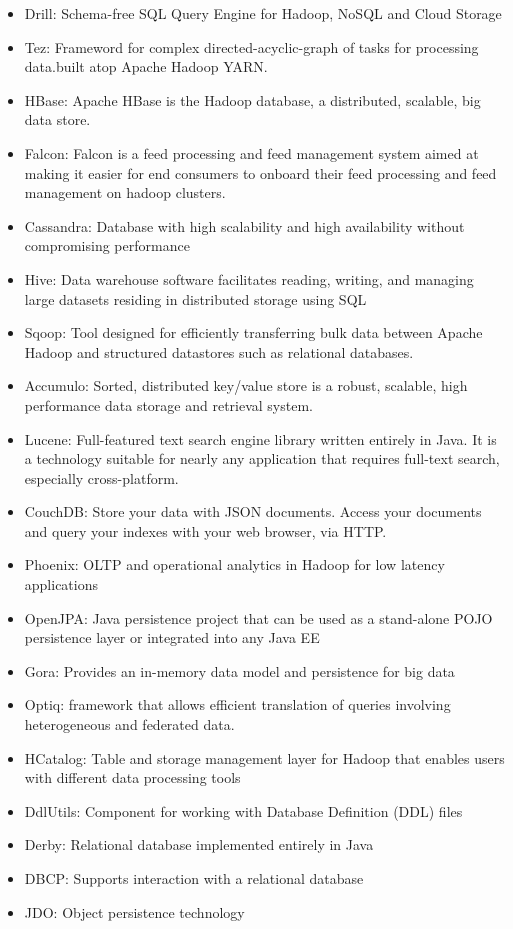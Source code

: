 \documentclass[12pt]{report}
\providecommand{\tightlist}{%
  \setlength{\itemsep}{0pt}\setlength{\parskip}{0pt}}
\begin{document}
\begin{itemize}
\tightlist
\item
  Drill: Schema-free SQL Query Engine for Hadoop, NoSQL and Cloud
  Storage
\item
  Tez: Frameword for complex directed-acyclic-graph of tasks for
  processing data.built atop Apache Hadoop YARN.
\item
  HBase: Apache HBase is the Hadoop database, a distributed, scalable,
  big data store.
\item
  Falcon: Falcon is a feed processing and feed management system aimed
  at making it easier for end consumers to onboard their feed processing
  and feed management on hadoop clusters.
\item
  Cassandra: Database with high scalability and high availability
  without compromising performance
\item
  Hive: Data warehouse software facilitates reading, writing, and
  managing large datasets residing in distributed storage using SQL
\item
  Sqoop: Tool designed for efficiently transferring bulk data between
  Apache Hadoop and structured datastores such as relational databases.
\item
  Accumulo: Sorted, distributed key/value store is a robust, scalable,
  high performance data storage and retrieval system.
\item
  Lucene: Full-featured text search engine library written entirely in
  Java. It is a technology suitable for nearly any application that
  requires full-text search, especially cross-platform.
\item
  CouchDB: Store your data with JSON documents. Access your documents
  and query your indexes with your web browser, via HTTP.
\item
  Phoenix: OLTP and operational analytics in Hadoop for low latency
  applications
\item
  OpenJPA: Java persistence project that can be used as a stand-alone
  POJO persistence layer or integrated into any Java EE
\item
  Gora: Provides an in-memory data model and persistence for big data
\item
  Optiq: framework that allows efficient translation of queries
  involving heterogeneous and federated data.
\item
  HCatalog: Table and storage management layer for Hadoop that enables
  users with different data processing tools
\item
  DdlUtils: Component for working with Database Definition (DDL) files
\item
  Derby: Relational database implemented entirely in Java
\item
  DBCP: Supports interaction with a relational database
\item
  JDO: Object persistence technology
\end{itemize}
\end{document}

